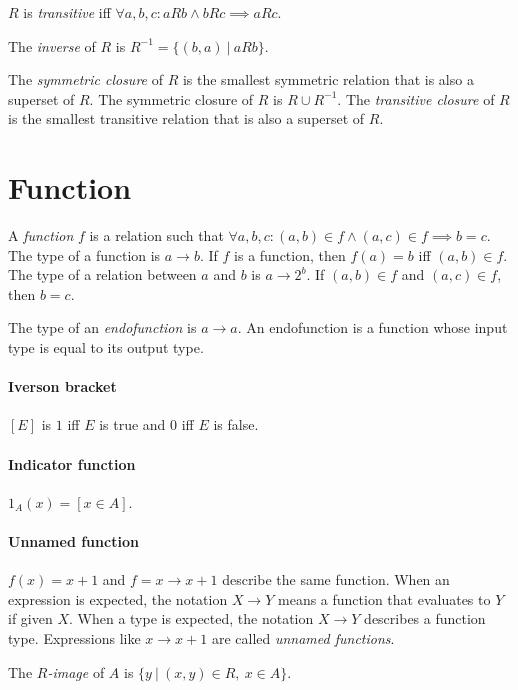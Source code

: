 \(R\) is \emph{transitive} iff \(\forall a,b,c : a R b \wedge b R c \implies a R c\).

The \emph{inverse} of \(R\) is \(R^{-1} = \{ (b,a) ~|~ a R b \}\).

The
%
\emph{symmetric closure} of \(R\)
is the smallest symmetric relation that is also a superset of \(R\).
The symmetric closure of \(R\) is \(R \cup R^{-1}\).
The
%
\emph{transitive closure} of \(R\)
is the smallest transitive relation that is also a superset of \(R\).

\section{Function}

%
A \emph{function} \(f\) is a relation such that
\(\forall a, b, c : (a,b) \in f \wedge (a,c) \in f \implies b = c\).
The type of a function is \(a \to b\).
If \(f\) is a function, then \(f(a) = b\) iff \((a,b) \in f\).
The type of a relation between \(a\) and \(b\) is \(a \to 2^b\).
If $(a,b) \in f$ and $(a,c) \in f$, then $b = c$.

%
The type of an \emph{endofunction} is \(a \to a\).
An endofunction is a function whose input type is equal to its output type.

%
\paragraph{Iverson bracket}
\([E]\) is \(1\) iff \(E\) is true
and \(0\) iff \(E\) is false.

%
\paragraph{Indicator function}
\(1_A(x) = [x \in A]\).

%
\paragraph{Unnamed function}
\(f(x) = x + 1\) and \(f = x \to x+1\) describe the same function.
When an expression is expected, the notation \(X \to Y\)
means a function that evaluates to \(Y\) if given \(X\).
When a type is expected, the notation \(X \to Y\) describes a function type.
Expressions like \(x \to x + 1\) are called \emph{unnamed functions}.

The
%
\emph{\(R\)-image} of \(A\) is \(\{ y ~|~ (x,y) \in R, ~ x \in A \}\).

